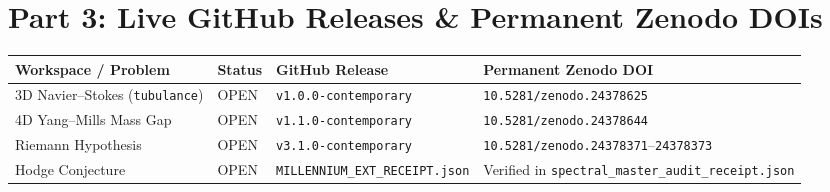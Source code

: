 \documentclass[11pt,a4paper]{article}
\begin{document}
\section*{Part 3: Live GitHub Releases \& Permanent Zenodo DOIs}

\begin{center}
\scriptsize
\begin{tabular}{@{}llll@{}}
\toprule
Workspace / Problem & Status & GitHub Release & Permanent Zenodo DOI \\
\midrule
3D Navier--Stokes (\texttt{tubulance}) & OPEN & \texttt{v1.0.0-contemporary} & \texttt{10.5281/zenodo.24378625} \\
4D Yang--Mills Mass Gap & OPEN & \texttt{v1.1.0-contemporary} & \texttt{10.5281/zenodo.24378644} \\
Riemann Hypothesis & OPEN & \texttt{v3.1.0-contemporary} & \texttt{10.5281/zenodo.24378371}--\texttt{24378373} \\
Hodge Conjecture & OPEN & \texttt{MILLENNIUM\_EXT\_RECEIPT.json} & Verified in \texttt{spectral\_master\_audit\_receipt.json} \\
\bottomrule
\end{tabular}
\end{center}
\end{document}
